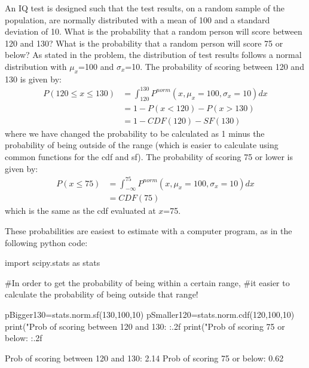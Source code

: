 \clearpage
\begin{example}{An IQ test is designed such that the test results, on a random sample of the population, are normally distributed with a mean of 100 and a standard deviation of 10. What is the probability that a random person will score between 120 and 130? What is the probability that a random person will score 75 or below?}
As stated in the problem, the distribution of test results follows a normal distribution with $\mu_x$=100 and $\sigma_x$=10. The probability of scoring between 120 and 130 is given by:
\begin{align*}
P(120 \leq x \leq 130)&=\int_{120}^{130}P^{norm}(x,\mu_x=100,\sigma_x=10)dx\\
&=1-P(x < 120)-P(x > 130)\\
&=1-CDF(120)-SF(130)
\end{align*}
where we have changed the probability to be calculated as 1 minus the probability of being outside of the range (which is easier to calculate using common functions for the cdf and sf). The probability of scoring 75 or lower is given by:
\begin{align*}
P(x \leq 75)&=\int_{-\infty}^{75}P^{norm}(x,\mu_x=100,\sigma_x=10)dx\\
&=CDF(75)
\end{align*}
which is the same as the cdf evaluated at $x$=75. 

These probabilities are easiest to estimate with a computer program, as in the following python code:
\begin{python}[caption = SF and CDF for normal distribution]
import scipy.stats as stats

#In order to get the probability of being within a certain range,
#it easier to calculate the probability of being outside that range!

pBigger130=stats.norm.sf(130,100,10)
pSmaller120=stats.norm.cdf(120,100,10)
print("Prob of scoring between 120 and 130: {:.2f} %
print("Prob of scoring 75 or below: {:.2f} %
\end{python}
\begin{poutput}
Prob of scoring between 120 and 130: 2.14 %
Prob of scoring 75 or below: 0.62 %
\end{poutput}
\end{example}

